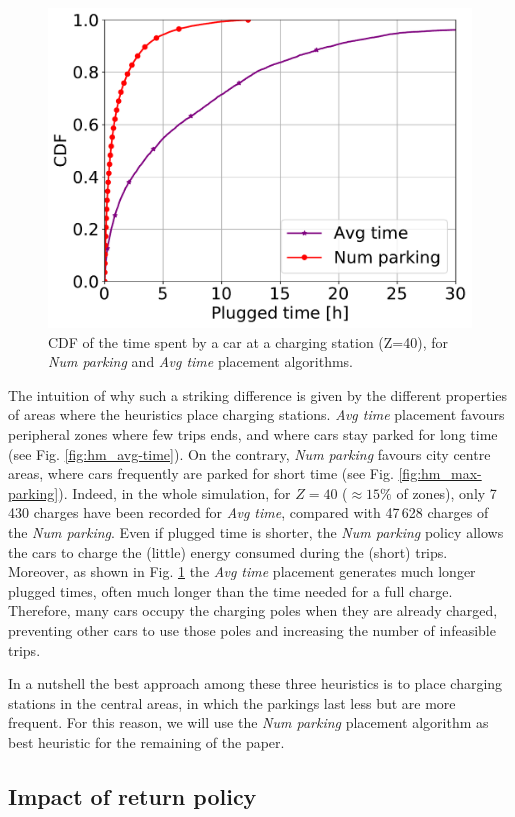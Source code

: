 \documentclass[review, letterpaper,3p, 11pt]{elsarticle}
\begin{document}
\begin{figure}[ht]
	\centering
	\includegraphics[width=0.5\columnwidth]{figures/CDF_parking_time_per_algorithm.pdf}
	\caption{CDF of the time spent by a car at a charging station (Z=40), for \textit{Num parking} and \textit{Avg time} placement algorithms. }
		\label{fig:CDF_parking_time_per_algorithm}
\end{figure}

The intuition of why such a striking difference is given by the different properties of areas where the heuristics place charging stations. \textit{Avg time} placement favours peripheral zones where few trips ends, and where cars stay parked for long time (see Fig. \ref{fig:hm_avg-time}). On the contrary, \textit{Num parking} favours city centre areas, where cars frequently are parked for short time (see Fig. \ref{fig:hm_max-parking}). Indeed, in the whole simulation, for $Z=40$ ($\approx 15\%$ of zones), only 7\,430 charges have been recorded for \textit{Avg time}, compared with 47\,628 charges of the \textit{Num parking}.
Even if plugged time is shorter, the \textit{Num parking} policy allows the cars to charge the (little) energy consumed during the (short) trips.
Moreover, as shown in Fig. \ref{fig:CDF_parking_time_per_algorithm} the \textit{Avg time} placement generates much longer plugged times, often much longer than the time needed for a full charge. Therefore, many cars occupy the charging poles when they are already charged, preventing other cars to use those poles and increasing the number of infeasible trips. 

In a nutshell the best approach among these three heuristics is to place charging stations in the central areas, in which the parkings last less but are more frequent. For this reason, we will use the \textit{Num parking} placement algorithm as best heuristic for the remaining of the paper.



\subsection{Impact of return policy}
\end{document}
